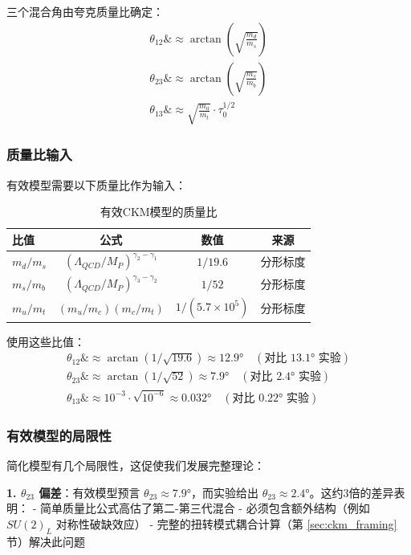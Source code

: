 三个混合角由夸克质量比确定：
\begin{align}
    \theta_{12} \&\approx \arctan\left(\sqrt{\frac{m_d}{m_s}}\right) \\
    \theta_{23} \&\approx \arctan\left(\sqrt{\frac{m_s}{m_b}}\right) \\
    \theta_{13} \&\approx \sqrt{\frac{m_u}{m_t}} \cdot \tau_0^{1/2}
\end{align}

\subsubsection{质量比输入}

有效模型需要以下质量比作为输入：

\begin{table}[h]
\centering
\begin{tabular}{lccc}
\hline
\textbf{比值} & \textbf{公式} & \textbf{数值} & \textbf{来源} \\
\hline
$m_d/m_s$ & $(\Lambda_{QCD}/M_P)^{\gamma_2-\gamma_1}$ & $1/19.6$ & 分形标度 \\
$m_s/m_b$ & $(\Lambda_{QCD}/M_P)^{\gamma_3-\gamma_2}$ & $1/52$ & 分形标度 \\
$m_u/m_t$ & $(m_u/m_c)(m_c/m_t)$ & $1/(5.7\times 10^5)$ & 分形标度 \\
\hline
\end{tabular}
\caption{有效CKM模型的质量比}
\end{table}

使用这些比值：
\begin{align}
    \theta_{12} \&\approx \arctan(1/\sqrt{19.6}) \approx 12.9° \quad (\text{对比 } 13.1° \text{ 实验}) \\
    \theta_{23} \&\approx \arctan(1/\sqrt{52}) \approx 7.9° \quad (\text{对比 } 2.4° \text{ 实验}) \\
    \theta_{13} \&\approx 10^{-3} \cdot \sqrt{10^{-6}} \approx 0.032° \quad (\text{对比 } 0.22° \text{ 实验})
\end{align}

\subsubsection{有效模型的局限性}

简化模型有几个局限性，这促使我们发展完整理论：

\textbf{1. $\theta_{23}$ 偏差}：有效模型预言 $\theta_{23} \approx 7.9°$，而实验给出 $\theta_{23} \approx 2.4°$。这约3倍的差异表明：
- 简单质量比公式高估了第二-第三代混合
- 必须包含额外结构（例如 $SU(2)_L$ 对称性破缺效应）
- 完整的扭转模式耦合计算（第 \ref{sec:ckm_framing} 节）解决此问题

